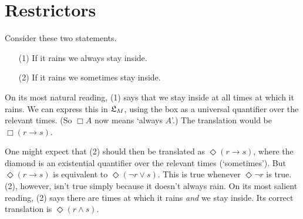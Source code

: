 
\fi


\section{Restrictors}
\label{sec:restrictor-analysis}

Consider these two statements.
\begin{enumerate}[leftmargin=10mm]
  \itemsep-1mm
  \item[(1)] If it rains we always stay inside.
  \item[(2)] If it rains we sometimes stay inside.
\end{enumerate}
On its most natural reading, (1) says that we stay inside at all times at which
it rains. We can express this in $\mathfrak{L}_{M}$, using the box as a universal
quantifier over the relevant times. (So $\Box A$ now means `always $A$'.) The
translation would be $\Box(r \to s)$.

One might expect that (2) should then be translated as $\Diamond(r \to s)$,
where the diamond is an existential quantifier over the relevant times
(`sometimes'). But $\Diamond(r \to s)$ is equivalent to
$\Diamond(\neg r \lor s)$. This is true whenever $\Diamond \neg r$ is true. (2),
however, isn't true simply because it doesn't always rain. On its most salient
reading, (2) says there are times at which it rains \emph{and} we stay inside.
Its correct translation is $\Diamond(r \land s)$.

